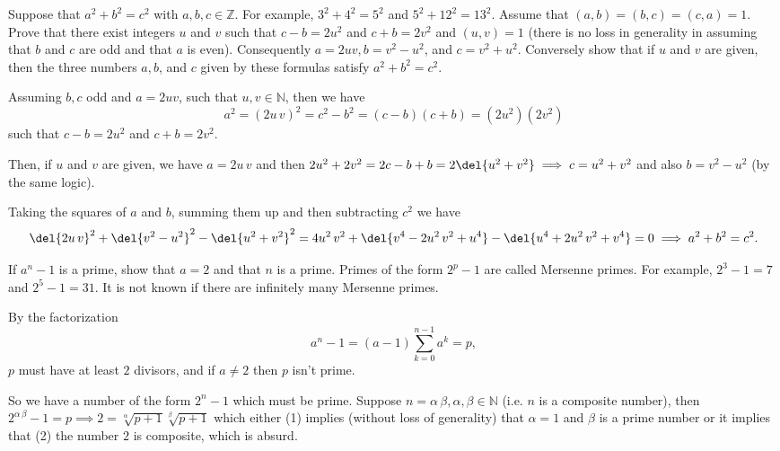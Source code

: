 \documentclass[english]{IMTexam}
\author{Isabella B. Amaral}
\begin{document}
	
	\maketitle	
	
	\begin{questions}
		\question\label{ques:IR:1.23} Suppose that $ a^{2} + b^{2} = c^{2} $ with $ a, b, c\in \mathbb{Z} $. For example, $ 3^{2} + 4^{2} = 5^{2} $ and $ 5^{2} + 12^{2} = 13^{2} $. Assume that $ (a, b) = (b, c) = (c, a) = 1 $. Prove that there exist integers $ u $ and $ v $ such that $ c - b = 2u^{2} $ and $ c + b = 2v^{2} $ and $ (u, v) = 1 $ (there is no loss in generality in assuming that $ b $ and $ c $ are odd and that $ a $ is even). Consequently $ a = 2uv, b = v^{2} - u^{2} $, and $ c = v^{2} + u^{2} $. Conversely show that if $ u $ and $ v $ are given, then the three numbers $ a, b $, and $ c $ given by these formulas satisfy $ a^{2} + b^{2} = c^{2} $.
		
		\begin{solution}
			Assuming $ b,c $ odd and $ a=2uv $, such that $ u,v\in\mathbb{N} $, then we have
			\[ a^{2}=(2u\,v)^{2}=c^{2}-b^{2}=(c-b)(c+b)=(2u^{2})(2v^{2}) \]
			such that $ c-b=2u^{2} $ and $ c+b=2v^{2} $.
			
			Then, if $ u $ and $ v $ are given, we have $ a=2u\,v $ and then $ 2u^{2}+2v^{2}=2c-b+b=2\del{u^{2}+v^{2}}\implies c=u^{2}+v^{2} $ and also $ b=v^{2}-u^{2} $ (by the same logic).
			
			Taking the squares of $ a$ and $ b $, summing them up and then subtracting $ c^{2} $ we have
			\[ \del{2u\,v}^{2}+\del{v^{2}-u^{2}}^{2}-\del{u^{2}+v^{2}}^{2}=4u^{2}\,v^{2}+\del{v^{4}-2u^{2}\,v^{2}+u^{4}}-\del{u^{4}+2u^{2}\,v^{2}+v^{4}}=0\implies a^{2}+b^{2}=c^{2}. \]
			
			\hfill\qedsymbol
		\end{solution}
		
		\question\label{ques:IR:1.25} If $ a^{n} - 1 $ is a prime, show that $ a = 2 $ and that $ n $ is a prime. Primes of the form $ 2^{p} - 1 $ are called Mersenne primes. For example, $ 2^{3} - 1 = 7 $ and $ 2^{5} - 1 = 31 $. It is not known if there are infinitely many Mersenne primes.
		
		\begin{solution}
			By the factorization
			\[ a^{n}-1=(a-1)\sum_{k=0}^{n-1}a^{k}=p, \]
			$ p $ must have at least $ 2 $ divisors, and if $ a\neq 2  $ then $ p $ isn't prime.
			
			So we have a number of the form $ 2^{n}-1 $ which must be prime. Suppose $ n=\alpha\,\beta,\alpha,\beta\in\mathbb{N} $ (i.e. $ n $ is a composite number), then $ 2^{\alpha\,\beta}-1=p\implies 2=\sqrt[\alpha]{p+1}\sqrt[\beta]{p+1} $ which either (1) implies (without loss of generality) that $ \alpha=1 $ and $ \beta $ is a prime number or it implies that (2) the number $ 2 $ is composite, which is absurd.
			

\end{solution}
\end{questions}
\end{document}

